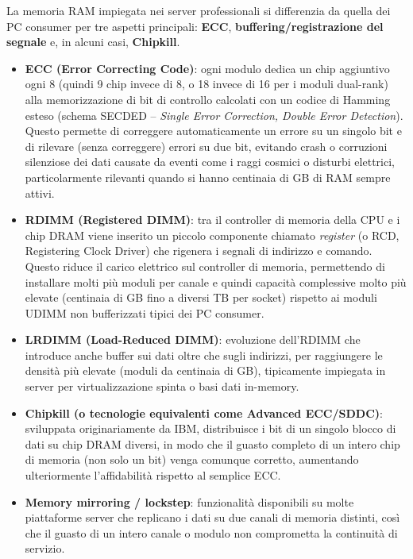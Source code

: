 \documentclass[11pt,a4paper]{article}
\begin{document}
La memoria RAM impiegata nei server professionali si differenzia da quella dei PC consumer per tre aspetti principali: \textbf{ECC}, \textbf{buffering/registrazione del segnale} e, in alcuni casi, \textbf{Chipkill}.

\begin{itemize}[nosep]
    \item \textbf{ECC (Error Correcting Code)}: ogni modulo dedica un chip aggiuntivo ogni 8 (quindi 9 chip invece di 8, o 18 invece di 16 per i moduli dual-rank) alla memorizzazione di bit di controllo calcolati con un codice di Hamming esteso (schema SECDED -- \emph{Single Error Correction, Double Error Detection}). Questo permette di correggere automaticamente un errore su un singolo bit e di rilevare (senza correggere) errori su due bit, evitando crash o corruzioni silenziose dei dati causate da eventi come i raggi cosmici o disturbi elettrici, particolarmente rilevanti quando si hanno centinaia di GB di RAM sempre attivi.
    \item \textbf{RDIMM (Registered DIMM)}: tra il controller di memoria della CPU e i chip DRAM viene inserito un piccolo componente chiamato \emph{register} (o RCD, Registering Clock Driver) che rigenera i segnali di indirizzo e comando. Questo riduce il carico elettrico sul controller di memoria, permettendo di installare molti più moduli per canale e quindi capacità complessive molto più elevate (centinaia di GB fino a diversi TB per socket) rispetto ai moduli UDIMM non bufferizzati tipici dei PC consumer.
    \item \textbf{LRDIMM (Load-Reduced DIMM)}: evoluzione dell'RDIMM che introduce anche buffer sui dati oltre che sugli indirizzi, per raggiungere le densità più elevate (moduli da centinaia di GB), tipicamente impiegata in server per virtualizzazione spinta o basi dati in-memory.
    \item \textbf{Chipkill (o tecnologie equivalenti come Advanced ECC/SDDC)}: sviluppata originariamente da IBM, distribuisce i bit di un singolo blocco di dati su chip DRAM diversi, in modo che il guasto completo di un intero chip di memoria (non solo un bit) venga comunque corretto, aumentando ulteriormente l'affidabilità rispetto al semplice ECC.
    \item \textbf{Memory mirroring / lockstep}: funzionalità disponibili su molte piattaforme server che replicano i dati su due canali di memoria distinti, così che il guasto di un intero canale o modulo non comprometta la continuità di servizio.
\end{itemize}
\end{document}
